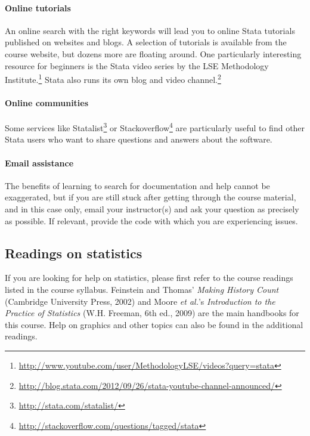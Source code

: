 \paragraph{Online tutorials}%
%
An online search with the right keywords will lead you to online Stata tutorials published on websites and blogs. A selection of tutorials is available from the course website, but dozens more are floating around. One particularly interesting resource for beginners is the Stata video series by the LSE Methodology Institute.\footnote{\url{http://www.youtube.com/user/MethodologyLSE/videos?query=stata}} Stata also runs its own blog and video channel.\footnote{\url{http://blog.stata.com/2012/09/26/stata-youtube-channel-announced/}}


\paragraph{Online communities}%
%
Some services like Statalist\footnote{\url{http://stata.com/statalist/}} or Stackoverflow\footnote{\url{http://stackoverflow.com/questions/tagged/stata}} are particularly useful to find other Stata users who want to share questions and answers about the software.


\paragraph{Email assistance}%
%
The benefits of learning to search for documentation and help cannot be exaggerated, but if you are still stuck after getting through the course material, and in this case only, email your instructor(s) and ask your question as precisely as possible. If relevant, provide the code with which you are experiencing issues.


%
%
\subsection{Readings on statistics}

If you are looking for help on statistics, please first refer to the course readings listed in the course syllabus. Feinstein and Thomas’ \emph{Making History Count} (Cambridge University Press, 2002) and Moore \emph{et al.}'s \emph{Introduction to the Practice of Statistics} (W.H. Freeman, 6th ed., 2009) are the main handbooks for this course. Help on graphics and other topics can also be found in the additional readings.



%
%